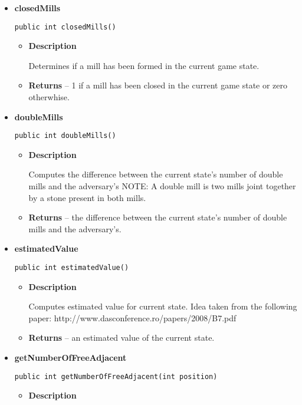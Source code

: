 \documentclass[11pt,a4paper]{report}
\begin{document}
{{{{{{{{{{{\begin{itemize}
{\begin{itemize}
{Creates a clone of a game state.
}
\item{{\bf  Returns} -- 
a clone object of the game state. 
}%
\end{itemize}
}%
\item{ 
{\bf  closedMills}\\
\begin{lstlisting}[frame=none]
public int closedMills()\end{lstlisting} %
\begin{itemize}
\item{
{\bf  Description}

Determines if a mill has been formed in the current game state.
}
\item{{\bf  Returns} -- 
1 if a mill has been closed in the current game state or zero otherwhise. 
}%
\end{itemize}
}%
\item{ 
{\bf  doubleMills}\\
\begin{lstlisting}[frame=none]
public int doubleMills()\end{lstlisting} %
\begin{itemize}
\item{
{\bf  Description}

Computes the difference between the current state's number of double mills and the adversary's NOTE: A double mill is two mills joint together by a stone present in both mills.
}
\item{{\bf  Returns} -- 
the difference between the current state's number of double mills and the adversary's. 
}%
\end{itemize}
}%
\item{ 
{\bf  estimatedValue}\\
\begin{lstlisting}[frame=none]
public int estimatedValue()\end{lstlisting} %
\begin{itemize}
\item{
{\bf  Description}

Computes estimated value for current state. Idea taken from the following paper: http://www.dasconference.ro/papers/2008/B7.pdf
}
\item{{\bf  Returns} -- 
an estimated value of the current state. 
}%
\end{itemize}
}%
\item{ 
{\bf  getNumberOfFreeAdjacent}\\
\begin{lstlisting}[frame=none]
public int getNumberOfFreeAdjacent(int position)\end{lstlisting} %
\begin{itemize}
\item{
{\bf  Description}

}
\end{itemize}}
\end{itemize}}}}}}}}}}}}
\end{document}

